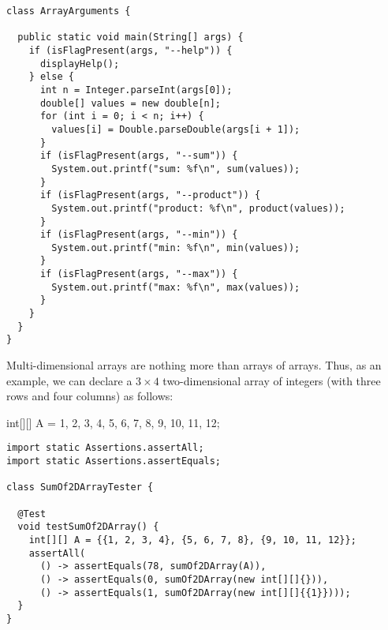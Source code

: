 \begin{lstlisting}[language=MyJava]
class ArrayArguments {

  public static void main(String[] args) {
    if (isFlagPresent(args, "--help")) {
      displayHelp();
    } else {
      int n = Integer.parseInt(args[0]);
      double[] values = new double[n];
      for (int i = 0; i < n; i++) { 
        values[i] = Double.parseDouble(args[i + 1]); 
      }
      if (isFlagPresent(args, "--sum")) { 
        System.out.printf("sum: %f\n", sum(values)); 
      }
      if (isFlagPresent(args, "--product")) { 
        System.out.printf("product: %f\n", product(values)); 
      }
      if (isFlagPresent(args, "--min")) { 
        System.out.printf("min: %f\n", min(values)); 
      }
      if (isFlagPresent(args, "--max")) { 
        System.out.printf("max: %f\n", max(values)); 
      }
    }
  }
}
\end{lstlisting}


Multi-dimensional arrays are nothing more than arrays of arrays. Thus, as an example, we can declare a $3 \times 4$ two-dimensional array of integers (with three rows and four columns) as follows:
\begin{verbnobox}[\small]
int[][] A = {{1, 2, 3, 4}, {5, 6, 7, 8}, {9, 10, 11, 12}};
\end{verbnobox}


\begin{lstlisting}[language=MyJava]
import static Assertions.assertAll;
import static Assertions.assertEquals;

class SumOf2DArrayTester {

  @Test
  void testSumOf2DArray() {
    int[][] A = {{1, 2, 3, 4}, {5, 6, 7, 8}, {9, 10, 11, 12}};
    assertAll(
      () -> assertEquals(78, sumOf2DArray(A)),
      () -> assertEquals(0, sumOf2DArray(new int[][]{})),
      () -> assertEquals(1, sumOf2DArray(new int[][]{{1}})));
  }
}
\end{lstlisting}

